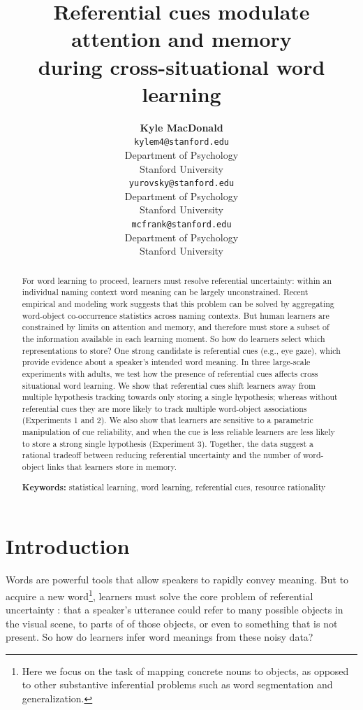 \documentclass[10pt,letterpaper]{article}
\title{Referential cues modulate attention and memory \\
during cross-situational word learning}
\author{{\large \bf Kyle MacDonald} \\ \texttt{kylem4@stanford.edu} \\ Department of Psychology \\ Stanford University
  \And {\large \bf  Daniel Yurovsky} \\ \texttt{yurovsky@stanford.edu} \\ Department of Psychology \\ Stanford University
  \And {\large \bf Michael C. Frank} \\  \texttt{mcfrank@stanford.edu} \\Department of Psychology \\ Stanford University}
\begin{document}

\maketitle


\begin{abstract}
For word learning to proceed, learners must resolve referential uncertainty: within an 
individual naming context word meaning can be largely unconstrained. 
Recent empirical and modeling work suggests that this problem can be solved by aggregating 
word-object co-occurrence statistics across naming contexts. But human learners are constrained by limits on 
attention and memory, and therefore must store a subset of the information available in each learning moment.
So how do learners select which representations to store? One strong candidate 
is referential cues (e.g., eye gaze), which provide evidence about a speaker's intended word meaning. In three
large-scale experiments with adults, we test how the presence of referential cues affects cross situational word learning. 
We show that referential cues shift learners away from multiple hypothesis tracking towards only storing a single hypothesis; 
whereas without referential cues they are more likely to track multiple word-object associations (Experiments 1 and 2). 
We also show that learners are sensitive to a parametric manipulation of cue reliability, and when the cue is less reliable learners
are less likely to store a strong single hypothesis (Experiment 3). 
Together, the data suggest a rational tradeoff between reducing referential uncertainty and 
the number of word-object links that learners store in memory. 

\textbf{Keywords:} 
statistical learning, word learning, referential cues, resource rationality
\end{abstract}


\section{Introduction}

Words are powerful tools that allow speakers to rapidly convey meaning. But to acquire a new word\footnote{Here we focus on the task of mapping concrete nouns to objects, as opposed to other substantive inferential problems such as word segmentation and generalization.}, learners must solve the core problem of referential uncertainty \cite{quine19600}: that a speaker's utterance could refer to many possible objects in the visual scene, to parts of of those objects, or even to something that is not present. So how do learners infer word meanings from these noisy data?
\end{document}

